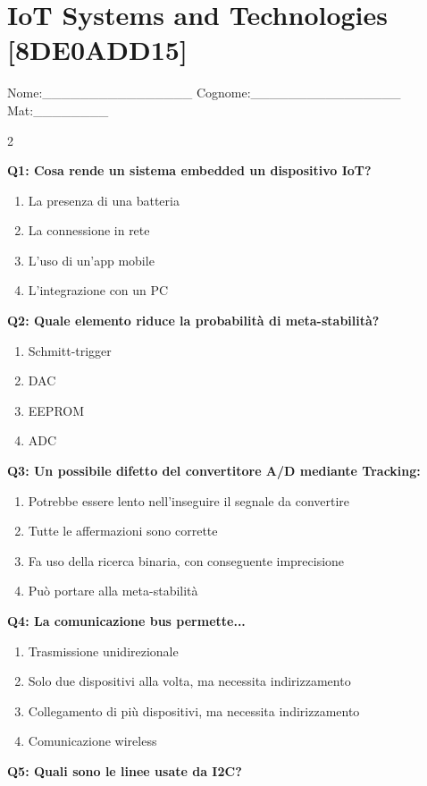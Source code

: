 \documentclass[10pt]{article}
\begin{document}
\newpage

\section*{IoT Systems and Technologies \footnotesize [8DE0ADD15]}
{\footnotesize Nome:\_\_\_\_\_\_\_\_\_\_\_\_\_\_\_\_ Cognome:\_\_\_\_\_\_\_\_\_\_\_\_\_\_\_\_ Mat:\_\_\_\_\_\_\_\_}
\begin{multicols}{2}

\textbf{Q1: Cosa rende un sistema embedded un dispositivo IoT?}

\begin{enumerate}[label=\arabic*.]
\item La presenza di una batteria
\item La connessione in rete
\item L’uso di un'app mobile
\item L’integrazione con un PC
\end{enumerate}
\textbf{Q2: Quale elemento riduce la probabilità di meta-stabilità?}

\begin{enumerate}[label=\arabic*.]
\item Schmitt-trigger
\item DAC
\item EEPROM
\item ADC
\end{enumerate}
\textbf{Q3: Un possibile difetto del convertitore A/D mediante Tracking:}

\begin{enumerate}[label=\arabic*.]
\item Potrebbe essere lento nell'inseguire il segnale da convertire
\item Tutte le affermazioni sono corrette
\item Fa uso della ricerca binaria, con conseguente imprecisione
\item Può portare alla meta-stabilità
\end{enumerate}
\textbf{Q4: La comunicazione bus permette...}

\begin{enumerate}[label=\arabic*.]
\item Trasmissione unidirezionale
\item Solo due dispositivi alla volta, ma necessita indirizzamento
\item Collegamento di più dispositivi, ma necessita indirizzamento
\item Comunicazione wireless
\end{enumerate}
\textbf{Q5: Quali sono le linee usate da I2C?}


\end{multicols}
\end{document}
